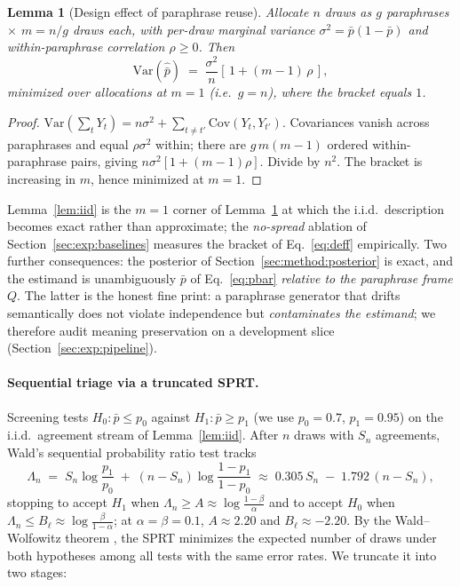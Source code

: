 \documentclass[11pt]{article}
\newtheorem{lemma}{Lemma}
\newcommand{\pbar}{\bar{p}}
\begin{document}
\begin{lemma}[Design effect of paraphrase reuse]
\label{lem:deff}
Allocate $n$ draws as $g$ paraphrases $\times$ $m = n/g$ draws each,
with per-draw marginal variance $\sigma^2 = \pbar(1-\pbar)$ and
within-paraphrase correlation $\rho \ge 0$. Then
\begin{equation}
  \mathrm{Var}\!\left(\hat{\pbar}\right)
  \;=\; \frac{\sigma^2}{n}\left[\,1 + (m - 1)\,\rho\,\right],
  \label{eq:deff}
\end{equation}
minimized over allocations at $m = 1$ (i.e.\ $g = n$), where the
bracket equals $1$.
\end{lemma}

\begin{proof}
$\mathrm{Var}(\sum_t Y_t) = n\sigma^2 + \sum_{t \neq t'}
\mathrm{Cov}(Y_t, Y_{t'})$. Covariances vanish across paraphrases and
equal $\rho\sigma^2$ within; there are $g\, m(m-1)$ ordered
within-paraphrase pairs, giving $n\sigma^2[1 + (m-1)\rho]$. Divide by
$n^2$. The bracket is increasing in $m$, hence minimized at $m=1$.
\end{proof}

Lemma~\ref{lem:iid} is the $m = 1$ corner of Lemma~\ref{lem:deff} at
which the i.i.d.\ description becomes exact rather than approximate;
the \emph{no-spread} ablation of Section~\ref{sec:exp:baselines}
measures the bracket of Eq.~\eqref{eq:deff} empirically. Two further
consequences: the posterior of Section~\ref{sec:method:posterior} is
exact, and the estimand is unambiguously $\pbar$ of Eq.~\eqref{eq:pbar}
\emph{relative to the paraphrase frame $Q$}. The latter is the honest
fine print: a paraphrase generator that drifts semantically does not
violate independence but \emph{contaminates the estimand}; we therefore
audit meaning preservation on a development slice
(Section~\ref{sec:exp:pipeline}).

\paragraph{Sequential triage via a truncated SPRT.}
Screening tests $H_0 : \pbar \le p_0$ against $H_1 : \pbar \ge p_1$
(we use $p_0 = 0.7$, $p_1 = 0.95$) on the i.i.d.\ agreement stream of
Lemma~\ref{lem:iid}. After $n$ draws with $S_n$ agreements, Wald's
sequential probability ratio test \citep{wald1945} tracks
\begin{equation}
  \Lambda_n \;=\; S_n \log\frac{p_1}{p_0}
  \;+\; (n - S_n)\log\frac{1 - p_1}{1 - p_0}
  \;\approx\; 0.305\, S_n \;-\; 1.792\,(n - S_n),
  \label{eq:sprt}
\end{equation}
stopping to accept $H_1$ when $\Lambda_n \ge A \approx
\log\frac{1-\beta}{\alpha}$ and to accept $H_0$ when $\Lambda_n \le
B_\ell \approx \log\frac{\beta}{1-\alpha}$; at $\alpha = \beta = 0.1$,
$A \approx 2.20$ and $B_\ell \approx -2.20$. By the Wald--Wolfowitz
theorem \citep{waldwolfowitz1948}, the SPRT minimizes the expected
number of draws under both hypotheses among all tests with the same
error rates. We truncate it into two stages:
\end{document}
